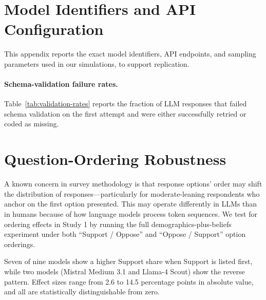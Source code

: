 \documentclass[12pt]{article}
\begin{document}
\section{Model Identifiers and API Configuration}\label{app:model-ids}

This appendix reports the exact model identifiers, API endpoints, and sampling parameters used in our simulations, to support replication.

\label{tab:model-ids-detail}

\label{tab:cost-by-model}

\paragraph{Schema-validation failure rates.} Table~\ref{tab:validation-rates} reports the fraction of LLM responses that failed schema validation on the first attempt and were either successfully retried or coded as missing.

\label{tab:validation-rates}


\section{Question-Ordering Robustness}\label{app:order-bias}

A known concern in survey methodology is that response options' order may shift the distribution of responses---particularly for moderate-leaning respondents who anchor on the first option presented. This may operate differently in LLMs than in humans because of how language models process token sequences. We test for ordering effects in Study 1 by running the full demographics-plus-beliefs experiment under both ``Support / Oppose'' and ``Oppose / Support'' option orderings.

\label{tab:order-bias}

Seven of nine models show a higher Support share when Support is listed first, while two models (Mistral Medium 3.1 and Llama-4 Scout) show the reverse pattern. Effect sizes range from 2.6 to 14.5 percentage points in absolute value, and all are statistically distinguishable from zero.
\end{document}
